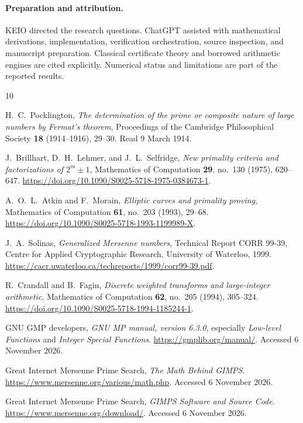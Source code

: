 \documentclass[11pt,a4paper]{article}
\theoremstyle{definition}
\begin{document}
\paragraph{Preparation and attribution.}
KEIO directed the research questions. ChatGPT assisted with mathematical
derivations, implementation, verification orchestration, source inspection,
and manuscript preparation. Classical certificate theory and borrowed
arithmetic engines are cited explicitly. Numerical status and limitations
are part of the reported results.

{}
\begin{thebibliography}{10}
\small\raggedright
{}
H.~C.~Pocklington,
\emph{The determination of the prime or composite nature of large numbers by Fermat's theorem},
Proceedings of the Cambridge Philosophical Society \textbf{18} (1914--1916), 29--30.
Read 9 March 1914.

J.~Brillhart, D.~H.~Lehmer, and J.~L.~Selfridge,
\emph{New primality criteria and factorizations of $2^m\pm1$},
Mathematics of Computation \textbf{29}, no.~130 (1975), 620--647.
\url{https://doi.org/10.1090/S0025-5718-1975-0384673-1}.

A.~O.~L.~Atkin and F.~Morain,
\emph{Elliptic curves and primality proving},
Mathematics of Computation \textbf{61}, no.~203 (1993), 29--68.
\url{https://doi.org/10.1090/S0025-5718-1993-1199989-X}.

J.~A.~Solinas,
\emph{Generalized Mersenne numbers},
Technical Report CORR 99-39, Centre for Applied Cryptographic Research,
University of Waterloo, 1999.
\url{https://cacr.uwaterloo.ca/techreports/1999/corr99-39.pdf}.

R.~Crandall and B.~Fagin,
\emph{Discrete weighted transforms and large-integer arithmetic},
Mathematics of Computation \textbf{62}, no.~205 (1994), 305--324.
\url{https://doi.org/10.1090/S0025-5718-1994-1185244-1}.

GNU GMP developers,
\emph{GNU MP manual, version 6.3.0}, especially
\emph{Low-level Functions} and \emph{Integer Special Functions}.
\url{https://gmplib.org/manual/}.
Accessed 6 November 2026.

Great Internet Mersenne Prime Search,
\emph{The Math Behind GIMPS}.
\url{https://www.mersenne.org/various/math.php}.
Accessed 6 November 2026.

Great Internet Mersenne Prime Search,
\emph{GIMPS Software and Source Code}.
\url{https://www.mersenne.org/download/}.
Accessed 6 November 2026.


\end{thebibliography}
\end{document}
